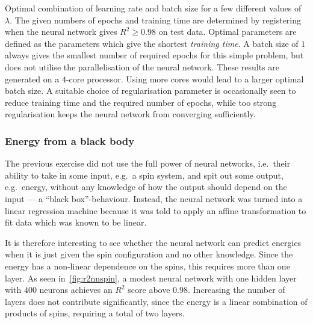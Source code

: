 \documentclass[11pt,british,a4paper]{article}
\numberwithin{equation}{section}
\begin{document}
\begin{table}[H]
    \centering
    \caption{Optimal combination of learning rate and batch size for a few different values of \(\lambda\). The given numbers of epochs and training time are determined by registering when the neural network gives \(R^2\geq \num{0.98}\) on test data. Optimal parameters are defined as the parameters which give the shortest \emph{training time}. A batch size of \(1\) always gives the smallest number of required epochs for this simple problem, but does not utilise the parallelisation of the neural network. These results are generated on a \(4\)-core processor. Using more cores would lead to a larger optimal batch size. A suitable choice of regularisation parameter is occasionally seen to reduce training time and the required number of epochs, while too strong regularisation keeps the neural network from converging sufficiently.}
\end{table}

\subsubsection{Energy from a black body}
The previous exercise did not use the full power of neural networks, i.e.\ their ability to take in some input, e.g.\ a spin system, and spit out some output, e.g.\ energy, without any knowledge of how the output should depend on the input --- a ``black box''-behaviour. Instead, the neural network was turned into a linear regression machine because it was told to apply an affine transformation to fit data which was known to be linear.

It is therefore interesting to see whether the neural network can predict energies when it is just given the spin configuration and no other knowledge. Since the energy has a non-linear dependence on the spins, this requires more than one layer. As seen in~\vref{fig:r2nnspin}, a modest neural network with one hidden layer with \(\num{400}\) neurons achieves an \(R^2\) score above \(\num{0.98}\). Increasing the number of layers does not contribute significantly, since the energy is a linear combination of products of spins, requiring a total of two layers.
\end{document}
